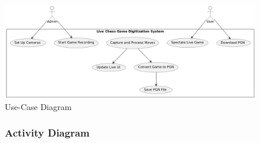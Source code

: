 \begin{figure}[h!]
    \centering
    \includegraphics[width=0.75\linewidth]{figures/methods/uml/use-case.png}
    \caption{Use-Case Diagram}
    \label{fig:use-case}
\end{figure}

\begin{figure}[h!]
    \subsubsection*{Activity Diagram}
    \label{subsubsec:activity-diagram}
    

\end{figure}
